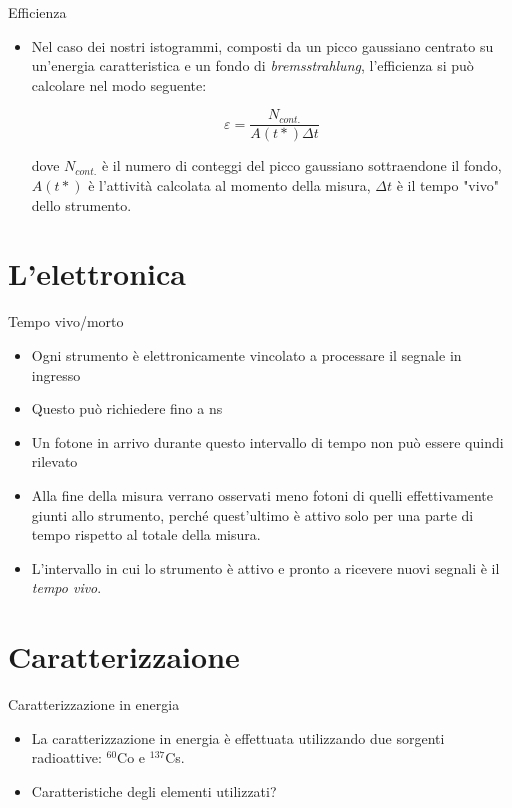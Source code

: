 \documentclass [xcolor=svgnames] {beamer}
\begin{document}
\begin{frame}{Efficienza}
	\begin{itemize}
		\item Nel caso dei nostri istogrammi, composti da un picco gaussiano centrato su un'energia caratteristica e un fondo di \emph{bremsstrahlung}, l'efficienza si può calcolare nel modo seguente:
		
		\begin{equation}
			\varepsilon = \dfrac{N_{cont.}}{A(t*) \Delta t}
		\end{equation}
	
		dove $N_{cont.}$ è il numero di conteggi del picco gaussiano sottraendone il fondo, $A(t*)$ è l'attività calcolata al momento della misura, $\Delta t$ è il tempo "vivo" dello strumento.
	\end{itemize}
\end{frame}

\section{L'elettronica}

\begin{frame}{Tempo vivo/morto}
	\begin{itemize}
		\item Ogni strumento è elettronicamente vincolato a processare il segnale in ingresso
		\item Questo può richiedere fino a ns
		\item Un fotone in arrivo durante questo intervallo di tempo non può essere quindi rilevato
		\item Alla fine della misura verrano osservati meno fotoni di quelli effettivamente giunti allo strumento, perché quest'ultimo è attivo solo per una parte di tempo rispetto al totale della misura.
		\item L'intervallo in cui lo strumento è attivo e pronto a ricevere nuovi segnali è il \emph{tempo vivo}.
	\end{itemize}
\end{frame}

\section{Caratterizzaione}
\begin{frame}{Caratterizzazione in energia}
	\begin{itemize}
		\item La caratterizzazione in energia è effettuata utilizzando due sorgenti radioattive: $^{60}$Co e $^{137}$Cs.
		\item Caratteristiche degli elementi utilizzati?
	\end{itemize}
\end{frame}
\end{document}
